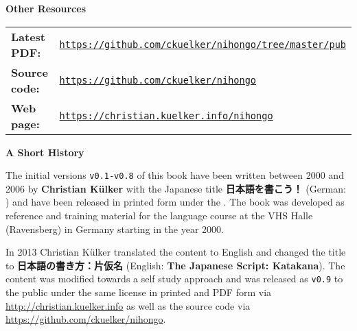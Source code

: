 \begingroup
\vspace*{100pt}

\begin{flushleft}
\fontsize{12pt}{12pt}\selectfont\sffamily
\textbf{Other Resources}
\vspace*{18pt}

\fontsize{12pt}{12pt}\selectfont\sffamily
\begin{tabular}{ l l }
\textbf{\sffamily Latest PDF:} &\texttt{\href{https://github.com/ckuelker/nihongo/tree/master/pub/}{https://github.com/ckuelker/nihongo/tree/master/pub}}\\
\textbf{\sffamily Source code:} &\texttt{\href{https://github.com/ckuelker/nihongo/}{https://github.com/ckuelker/nihongo}}\\
\textbf{\sffamily Web page:} &\texttt{\href{https://christian.kuelker.info/nihongo/}{https://christian.kuelker.info/nihongo}}\\
\end{tabular}

\vspace*{24pt}
\fontsize{12pt}{12pt}\selectfont\sffamily
\textbf{A Short History}\\
\vspace*{18pt}

\newcommand{\jfontsizenine}{\fontsize{9pt}{9pt}\selectfont\sffamily}

{

\fontsize{9pt}{9pt}\selectfont\sffamily

The initial versions \texttt{v0.1-v0.8} of this book have been written between
2000 and ⁠2006 by \textbf{Christian Külker} with the Japanese title
\textbf{日本語を書こう！} (German: \textit{}) and have been released in printed form under the
\textit{}.  The book was developed as reference and training material
for the language course at the VHS Halle (Ravensberg) in Germany starting in
the year 2000.\medskip

In 2013 Christian Külker translated the content to English and changed the
title to \textbf{日本語の書き方：片仮名} (English: \textbf{The Japanese Script:
Katakana}). The content was modified towards a self study approach and was
released as \texttt{v0.9} to the public under the same license in printed and
PDF form via \url{http://christian.kuelker.info} as well as the source code via
\url{https://github.com/ckuelker/nihongo}.\medskip

}
\end{flushleft}
